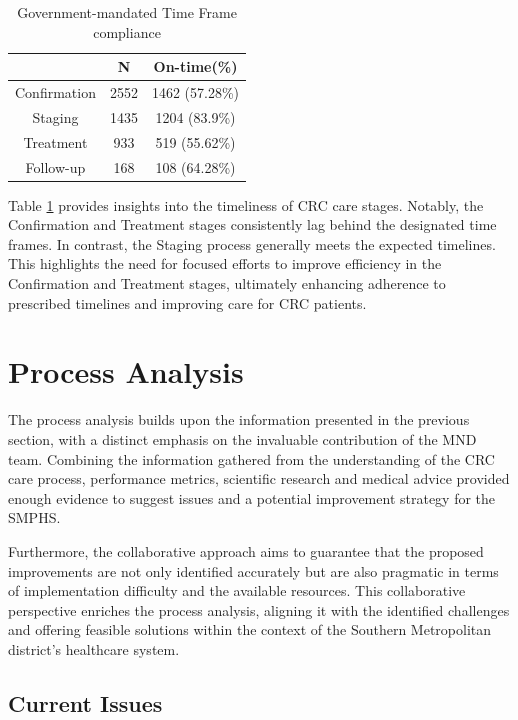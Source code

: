 \begin{table}[H]
\caption{Government-mandated Time Frame compliance}
\centering
\begin{tabular}{|c|c|c|}
\hline
 & N & On-time(\%)\\ \hline
Confirmation & 2552 & 1462 (57.28\%)\\ \hline
Staging &      1435 & 1204 (83.9\%)\\ \hline
Treatment &    933  & 519 (55.62\%)\\ \hline
Follow-up &    168  & 108 (64.28\%)\\ \hline
\end{tabular}
\label{table:government_kpis_compliance}
\end{table}

Table \ref{table:government_kpis_compliance} provides insights into the timeliness of CRC care stages. Notably, the Confirmation and Treatment stages consistently lag behind the designated time frames. In contrast, the Staging process generally meets the expected timelines. This highlights the need for focused efforts to improve efficiency in the Confirmation and Treatment stages, ultimately enhancing adherence to prescribed timelines and improving care for CRC patients.

\section{Process Analysis}

The process analysis builds upon the information presented in the previous section, with a distinct emphasis on the invaluable contribution of the MND team. Combining the information gathered from the understanding of the CRC care process, performance metrics, scientific research and medical advice provided enough evidence to suggest issues and a potential improvement strategy for the SMPHS.

Furthermore, the collaborative approach aims to guarantee that the proposed improvements are not only identified accurately but are also pragmatic in terms of implementation difficulty and the available resources. This collaborative perspective enriches the process analysis, aligning it with the identified challenges and offering feasible solutions within the context of the Southern Metropolitan district's healthcare system.

\subsection*{Current Issues}

